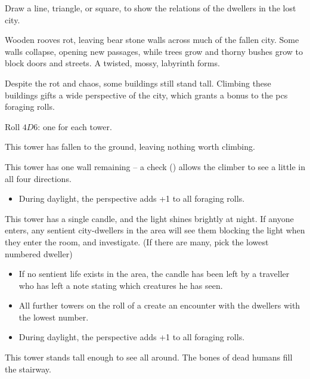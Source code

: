 \begin{multicols}{2}
Draw a line, triangle, or square, to show the relations of the dwellers in the lost city.

\cityRelations

\label{lostTowers}

Wooden rooves rot, leaving bear stone walls across much of the fallen city.
Some walls collapse, opening new passages, while trees grow and thorny bushes grow to block doors and streets.
A twisted, mossy, labyrinth forms.

Despite the rot and chaos, some buildings still stand tall.
Climbing these buildings gifts a wide perspective of the city, which grants a bonus to the \glspl{pc} foraging rolls.

Roll $4D6$: one for each tower.

\begin{dlist}
  \item
  This tower has fallen to the ground, leaving nothing worth climbing.
  \item
  This tower has one wall remaining -- a  check (\tn[8]) allows the climber to see a little in all four directions.
  \begin{itemize}
    \item
    During daylight, the perspective adds +1 to all foraging rolls.
  \end{itemize}
  \item
  This tower has a single candle, and the light shines brightly at night.
  If anyone enters, any sentient city-dwellers in the area will see them blocking the light when they enter the room, and investigate.
  (If there are many, pick the lowest numbered dweller)
  \begin{itemize}
    \item
    If no sentient life exists in the area, the candle has been left by a traveller who has left a note stating which creatures he has seen.
    \item
    All further towers on the roll of a  create an encounter with the dwellers with the lowest number.
    \item
    During daylight, the perspective adds +1 to all foraging rolls.
  \end{itemize}
  \item
  This tower stands tall enough to see all around.
  The bones of dead humans fill the stairway.


\end{dlist}
\end{multicols}
